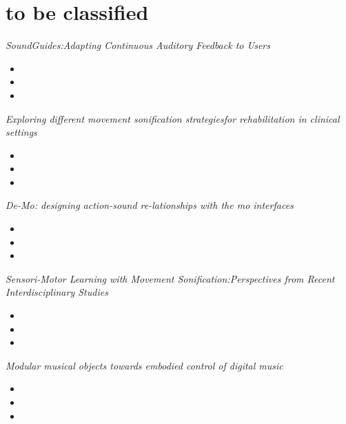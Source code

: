 \documentclass[11pt]{article}
\begin{document}
\section*{to be classified}
\textit{SoundGuides:Adapting Continuous Auditory Feedback to Users} \citep{francoise_soundguides_2016} 
\begin{itemize}
    \item 
    \item 
    \item 
\end{itemize}

\textit{Exploring different movement sonification strategiesfor rehabilitation in clinical settings} \citep{bevilacqua_exploring_2018}
\begin{itemize}
    \item 
    \item 
    \item 
\end{itemize}

\textit{De-Mo: designing action-sound re-lationships with the mo interfaces} \citep{bevilacqua_-mo_2013}
\begin{itemize}
    \item 
    \item 
    \item 
\end{itemize}

\textit{Sensori-Motor Learning with Movement Sonification:Perspectives from Recent Interdisciplinary Studies} \citep{bevilacqua_sensori-motor_2016}
\begin{itemize}
    \item 
    \item 
    \item 
\end{itemize}

\textit{Modular musical objects towards embodied control of digital music} \citep{rasamimanana_modular_2011}
\begin{itemize}
    \item 
    \item 
    \item 
\end{itemize}


\newpage


\end{document}
